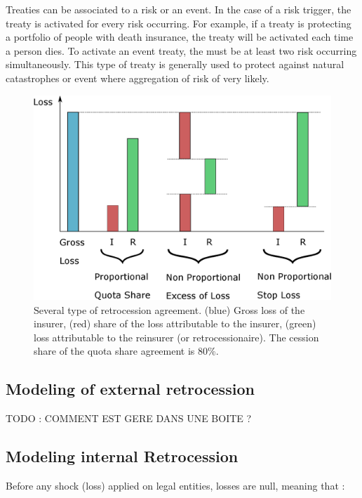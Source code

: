 Treaties can be associated to a risk or an event. In the case of a risk trigger, the treaty is activated for every risk occurring. For example, if a treaty is protecting a portfolio of people with death insurance, the treaty will be activated each time a person dies. To activate an event treaty, the must be at least two risk occurring simultaneously. This type of treaty is generally used to protect against natural catastrophes or event where aggregation of risk of very likely.


\begin{figure}[h!]
  \includegraphics[width=\linewidth]{images/part1/type_retrocession.eps}
  \caption{Several type of retrocession agreement. (blue) Gross loss of the insurer, (red) share of the loss attributable to the insurer, (green) loss attributable to the reinsurer (or retrocessionaire). The cession share of the quota share agreement is 80\%.}
  \label{fig:TYPE_RETROCESSION}
\end{figure}


\subsection{Modeling of external retrocession}


TODO : COMMENT EST GERE DANS UNE BOITE ?


\subsection{Modeling internal Retrocession}

Before any shock (loss) applied on legal entities, losses are null, meaning that :

